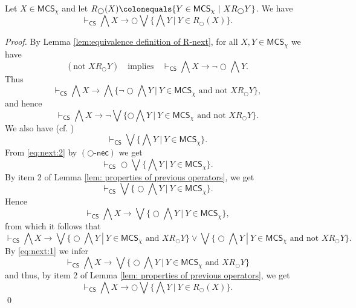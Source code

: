 \documentclass[envcountsect,envcountsame,oribibl,orivec]{llncs}
\newcommand{\lnext}{\bigcirc}
\newcommand{\necrule}{\ensuremath{\textsf{-nec}}}
\newcommand{\nextnecrule}{\ensuremath{(\lnext\necrule)}}
\newcommand{\CS}{\textsf{CS}}
\newcommand{\MCS}{\mathsf{MCS}}
\begin{document}
\begin{lemma}\label{l:4.4}
	Let $X \in \MCS_\chi$ and let 
	$R_\lnext(X) \colonequals \{ Y \in  \MCS_\chi \ |\ X R_\lnext  Y\}$.
	We have 
	\[
	\vdash_\CS \bigwedge X \to \lnext \bigvee \big\{ \bigwedge Y \ |\ Y \in R_\lnext(X) \big\}.
	\]
\end{lemma}
\begin{proof} 
	By Lemma \ref{lem:equivalence definition of R-next}, for all $X, Y \in \MCS_\chi$ we have
	\begin{equation*}
		(\text{not } X R_\lnext Y) 
		\quad\text{implies}\quad
		\vdash_\CS \bigwedge X \to \lnot \lnext \bigwedge Y.
	\end{equation*}
	Thus 
	\[
	\vdash_\CS \bigwedge X \to \bigwedge\{ \lnot \lnext \bigwedge Y~|~Y \in \MCS_\chi \text{~and not } X R_\lnext Y\},
	\]
	and hence
	\begin{equation}\label{eq:next:1}
		\vdash_\CS \bigwedge X \to \neg \bigvee \{ \lnext \bigwedge Y~|~ Y \in \MCS_\chi \text{~and not } X R_\lnext Y\}.
	\end{equation}
	We also have (cf. \cite[Lemma 4.1]{HvdMV04})
	\begin{equation}\label{eq:next:2}
		\vdash_\CS \bigvee \big\{ \bigwedge Y \ |\ Y \in  \MCS_\chi \big\}.
	\end{equation}
	From \eqref{eq:next:2} by $\nextnecrule$ we get
	\[
	\vdash_\CS \lnext\bigvee \big\{ \bigwedge Y \ |\ Y \in  \MCS_\chi \big\}.
	\]
	By item 2 of Lemma \ref{lem: properties of previous operators}, we get
	\begin{equation*}
		\vdash_\CS \bigvee \big\{ \lnext \bigwedge Y \ |\ Y \in  \MCS_\chi \big\}.
	\end{equation*}
	Hence
	\[
	\vdash_\CS \bigwedge X \to \bigvee \big\{ \lnext \bigwedge Y \ |\ Y \in  \MCS_\chi \big\},
	\]
	from which it follows that
	\[
	\vdash_\CS \bigwedge X \to \bigvee \big\{ \lnext \bigwedge Y \ |\ Y \in  \MCS_\chi \text{~and~} X R_\lnext Y \big\} \vee  \bigvee \big\{ \lnext \bigwedge Y \ |\ Y \in  \MCS_\chi \text{~and not~} X R_\lnext Y \big\}.
	\]
	By \eqref{eq:next:1} we infer
	\[
	\vdash_\CS \bigwedge X \to \bigvee \big\{ \lnext \bigwedge Y \ |\ Y \in  \MCS_\chi  \text{ and } X R_\lnext Y \big\}
	\]
	and thus, by item 2 of Lemma \ref{lem: properties of previous operators}, we get
	\[
	\vdash_\CS \bigwedge X \to \lnext \bigvee \big\{\bigwedge Y \ |\ Y \in  R_\lnext(X)\}. 
	\]
	\qed
\end{proof}
\end{document}
